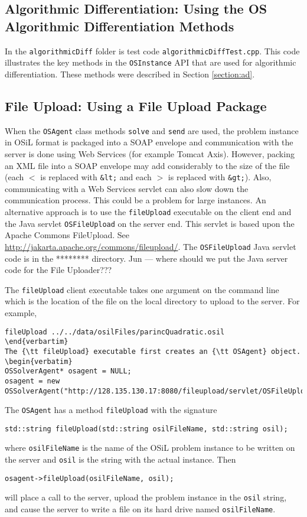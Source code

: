 \documentclass[11pt]{article}
\renewcommand{\_}{{\char"5F}}
\renewcommand{\{}{{\char"7B}}
\renewcommand{\}}{{\char"7D}}
\renewcommand{\^}{{\char"0D}}
\renewcommand{\'}{{\char"0D}}
\begin{document}
\subsection{Algorithmic Differentiation:  Using the OS Algorithmic Differentiation Methods}\label{section:cppad}

In the {\tt algorithmicDiff} folder is test code {\tt algorithmicDiffTest.cpp}. This code illustrates the key methods in the {\tt OSInstance} API that are used for algorithmic differentiation.   These methods were described in Section \ref{section:ad}.



\subsection{File Upload:  Using a File Upload Package}\label{section:fileupload}  



When the {\tt OSAgent}  class methods {\tt solve} and {\tt send} are used, the problem instance in OSiL format is packaged into a SOAP envelope and communication with the server is done using Web Services (for example Tomcat Axis). However, packing an XML file into a SOAP envelope may add considerably to the size of the file (each {\tt $<$} is replaced with {\tt \&lt;}  and each {\tt $>$} is replaced with {\tt \&gt;}). Also, communicating with a Web Services servlet can also slow down the communication process. This could be a problem for large instances. An alternative approach is to use the {\tt fileUpload} executable on the client end  and the Java servlet {\tt OSFileUpload} on the server end.  This servlet is based upon the Apache Commons FileUpload. See \url{http://jakarta.apache.org/commons/fileupload/}. The {\tt OSFileUpload} Java servlet code is in the ******** directory.  Jun --- where should we put the Java server code for the File Uploader???

The {\tt fileUpload} client executable takes one argument on the command line which is the location of the file on the local directory to upload to the server. For example,
\begin{verbatim}
fileUpload ../../data/osilFiles/parincQuadratic.osil
\end{verbartim}
The {\tt fileUpload} executable first creates an {\tt OSAgent} object.
\begin{verbatim}
OSSolverAgent* osagent = NULL;
osagent = new OSSolverAgent("http://128.135.130.17:8080/fileupload/servlet/OSFileUpload");
\end{verbatim}
The {\tt OSAgent}  has a method {\tt fileUpload} with the signature
\begin{verbatim}
std::string fileUpload(std::string osilFileName, std::string osil);
\end{verbatim}
where {\tt osilFileName} is  the name of the OSiL problem instance to be written on the server and {\tt osil} is the string with the actual instance. Then 
\begin{verbatim}
osagent->fileUpload(osilFileName, osil);
\end{verbatim}
will place a call to the server, upload the problem instance in the {\tt osil} string, and cause the server to write a file on its hard drive named {\tt osilFileName}.
\end{document}
